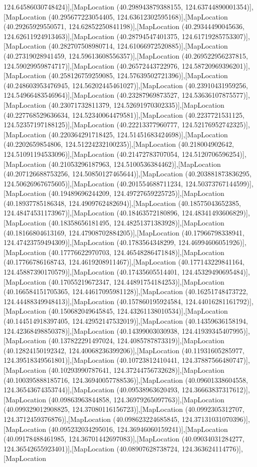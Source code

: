 124.64586030748424)],[MapLocation (40.298943879388155, 124.63744890001354)],[MapLocation (40.295677223054405, 124.63612302595168)],[MapLocation (40.29265929550571, 124.62852250841198)],[MapLocation (40.29344490045636, 124.62611924913463)],[MapLocation (40.28794547401375, 124.61719285753307)],[MapLocation (40.282707508980714, 124.61066972520885)],[MapLocation (40.27319028941459, 124.59613608556357)],[MapLocation (40.269522956237815, 124.59029959874717)],[MapLocation (40.26572443722976, 124.58720969396201)],[MapLocation (40.258126759259085, 124.57639502721396)],[MapLocation (40.248603953476945, 124.56202445461027)],[MapLocation (40.23910431959256, 124.54966483546964)],[MapLocation (40.23287969873527, 124.53636107875577)],[MapLocation (40.23071732811379, 124.52691970302335)],[MapLocation (40.227768529636634, 124.52340064479581)],[MapLocation (40.2237721531125, 124.52357197188125)],[MapLocation (40.22213377960777, 124.52176952742325)],[MapLocation (40.220364291718425, 124.51451683424698)],[MapLocation (40.2202659854806, 124.51224232100235)],[MapLocation (40.218004902642, 124.51091194533096)],[MapLocation (40.21472783707054, 124.5120706596254)],[MapLocation (40.21053296187963, 124.5100536384462)],[MapLocation (40.207126688753256, 124.50850127465644)],[MapLocation (40.203881873836295, 124.50626967675605)],[MapLocation (40.201554688711234, 124.50373767144599)],[MapLocation (40.19489696244209, 124.49727659225725)],[MapLocation (40.18937785186348, 124.4909762482694)],[MapLocation (40.18575043652385, 124.48474531173967)],[MapLocation (40.18463572180896, 124.48341493606829)],[MapLocation (40.18358656181495, 124.48251371383928)],[MapLocation (40.18166804613169, 124.47908702884205)],[MapLocation (40.17966798338941, 124.47423759494309)],[MapLocation (40.1783564348299, 124.46994606051926)],[MapLocation (40.17776622970703, 124.46548286471848)],[MapLocation (40.17766786168743, 124.4619208911467)],[MapLocation (40.177143229841164, 124.45887390170579)],[MapLocation (40.17435605514401, 124.45329490695484)],[MapLocation (40.17055219672347, 124.44891754184253)],[MapLocation (40.166584151705365, 124.44617095981128)],[MapLocation (40.16251748473722, 124.44488349948413)],[MapLocation (40.157860195924584, 124.44016281161792)],[MapLocation (40.150682049645845, 124.43261138010534)],[MapLocation (40.144514918397405, 124.42952147532019)],[MapLocation (40.14359636158194, 124.42368498850378)],[MapLocation (40.14399003030938, 124.41939345407995)],[MapLocation (40.137822291497024, 124.4085787873319)],[MapLocation (40.12824150192342, 124.40068236399206)],[MapLocation (40.11931605285977, 124.39518349561801)],[MapLocation (40.10723812410441, 124.37887566480747)],[MapLocation (40.10293990787641, 124.37244756732628)],[MapLocation (40.100395888185716, 124.36940057788536)],[MapLocation (40.09601338604558, 124.36543674353744)],[MapLocation (40.09538963620493, 124.36663837317612)],[MapLocation (40.09863963844858, 124.36979265097763)],[MapLocation (40.099329012908825, 124.37080116156723)],[MapLocation (40.0992305312707, 124.3712459376876)],[MapLocation (40.098623224685845, 124.37131031070396)],[MapLocation (40.095232034295016, 124.36946060159241)],[MapLocation (40.09178488461985, 124.36701442697083)],[MapLocation (40.09034031284277, 124.36542655923401)],[MapLocation (40.08907628738724, 124.363624114776)],[MapLocation 